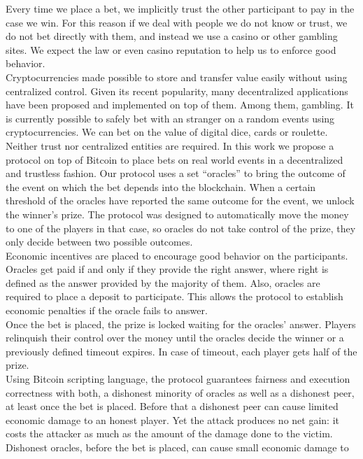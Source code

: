 Every time we place a bet, we implicitly trust the other participant  to pay in
  the case we win.
For this reason if we deal with people we do not know or trust, we do not bet
  directly with them, and instead we use a casino or other gambling sites.
We expect the law or even casino reputation to help us to enforce good
  behavior.\\
\noindent
Cryptocurrencies made possible to store and transfer value easily without
  using centralized control.
Given its recent popularity, many decentralized applications have been proposed
  and implemented on top of them.
Among them, gambling.
It is currently possible to safely bet with an stranger on a random events
  using cryptocurrencies.
We can bet on the value of digital dice, cards or roulette.
Neither trust nor centralized entities are required.
In this work we propose a protocol on top of Bitcoin to place bets on real world
  events in a decentralized and trustless fashion.
\noindent
Our protocol uses a set ``oracles'' to bring the outcome of the event on which
  the bet depends into the blockchain.
When a certain threshold of the oracles have reported the same outcome for
  the event, we unlock the winner's prize.
The protocol was designed to automatically move the money to one of the players
  in that case, so oracles do not take control of the prize, they only decide
  between two possible outcomes.\\
\noindent
Economic incentives are placed to encourage good behavior on the participants.
Oracles get paid if and only if they provide the right answer, where right is
  defined as the answer provided by the majority of them.
Also, oracles are required to place a deposit to participate.
This allows the protocol to establish economic penalties if the oracle fails to
  answer.\\
\noindent
Once the bet is placed, the prize is locked waiting for the oracles' answer.
Players relinquish their control over the money until the oracles decide the
  winner or a previously defined timeout expires.
In case of timeout, each player gets half of the prize.\\
\noindent
Using Bitcoin scripting language, the protocol guarantees fairness and execution
  correctness with both, a dishonest minority of oracles as well as a dishonest
  peer, at least once the bet is placed.
Before that a dishonest peer can cause limited economic damage to an honest
  player.
Yet the attack produces no net gain: it costs the attacker as much as the amount
  of the damage done to the victim.
Dishonest oracles, before the bet is placed, can cause small economic damage to
